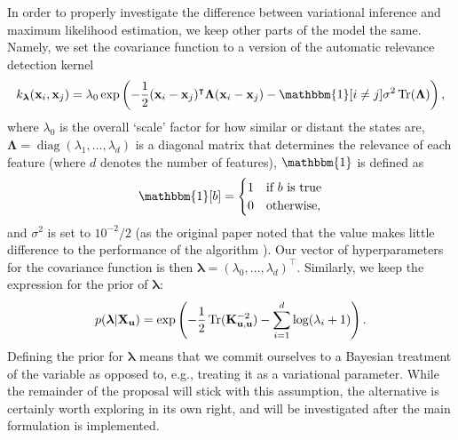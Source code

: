 \documentclass{mprop}
\theoremstyle{definition}
\DeclareMathOperator{\Tr}{Tr}
\DeclareMathOperator{\diag}{diag}
\begin{document}
In order to properly investigate the difference between variational inference
and maximum likelihood estimation, we keep other parts of the model the same.
Namely, we set the covariance function to a version of the automatic relevance
detection kernel \cite{DBLP:conf/nips/LevinePK11,neal2012bayesian}
\[ k_{\bm\lambda}(\mathbf{x}_i, \mathbf{x}_j) = \lambda_0\exp\left(
    -\frac{1}{2}(\mathbf{x}_i - \mathbf{x}_j)^\intercal\bm\Lambda(\mathbf{x}_i -
    \mathbf{x}_j) - \mathbbm{1}[i \ne j]\sigma^2\Tr(\bm\Lambda) \right), \]
where $\lambda_0$ is the overall `scale' factor for how similar or distant the
states are, $\bm\Lambda = \diag(\lambda_1, \dots, \lambda_d)$ is a diagonal
matrix that determines the relevance of each feature (where $d$ denotes the
number of features), $\mathbbm{1}$ is defined as
\[ \mathbbm{1}[b] = \begin{cases}
    1 & \mbox{if $b$ is true} \\
    0 & \mbox{otherwise},
  \end{cases} \]
and $\sigma^2$ is set to $10^{-2}/2$ (as the original paper noted that
the value makes little difference to the performance of the algorithm
\cite{DBLP:conf/nips/LevinePK11}). Our vector of hyperparameters for the
covariance function is then $\bm\lambda = (\lambda_0, \dots,
\lambda_d)^\intercal$. Similarly, we keep the expression for the prior of
$\bm\lambda$:
\begin{equation} \label{eq:theta_prior}
  p(\bm\lambda | \mathbf{X_u}) = \exp\left( -\frac{1}{2}\Tr(\Kuu^{-2}) -
    \sum_{i=1}^d \log(\lambda_i + 1) \right).
\end{equation}
Defining the prior for $\bm\lambda$ means that we commit ourselves to
a Bayesian treatment of the variable as opposed to, e.g., treating it as a
variational parameter. While the remainder of the proposal will stick with this
assumption, the alternative is certainly worth exploring in its own right, and
will be investigated after the main formulation is implemented.
\end{document}
